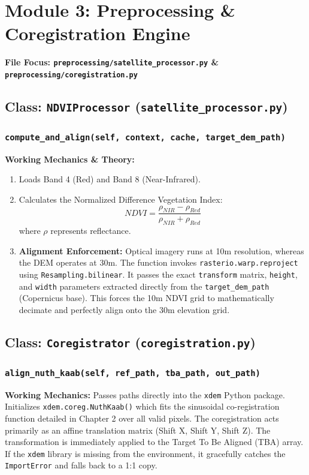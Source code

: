 \documentclass[11pt,a4paper,oneside]{report}
\begin{document}
\chapter{Module 3: Preprocessing \& Coregistration Engine}
\textbf{File Focus: \texttt{preprocessing/satellite\_processor.py} \& \texttt{preprocessing/coregistration.py}}

\section{Class: \texttt{NDVIProcessor} (\texttt{satellite\_processor.py})}
\subsection{\texttt{compute\_and\_align(self, context, cache, target\_dem\_path)}}
\textbf{Working Mechanics \& Theory:} 
\begin{enumerate}
    \item Loads Band 4 (Red) and Band 8 (Near-Infrared).
    \item Calculates the Normalized Difference Vegetation Index:
    \begin{equation}
        NDVI = \frac{\rho_{NIR} - \rho_{Red}}{\rho_{NIR} + \rho_{Red}}
    \end{equation}
    where $\rho$ represents reflectance.
    \item \textbf{Alignment Enforcement:} Optical imagery runs at 10m resolution, whereas the DEM operates at 30m. The function invokes \texttt{rasterio.warp.reproject} using \texttt{Resampling.bilinear}. It passes the exact \texttt{transform} matrix, \texttt{height}, and \texttt{width} parameters extracted directly from the \texttt{target\_dem\_path} (Copernicus base). This forces the 10m NDVI grid to mathematically decimate and perfectly align onto the 30m elevation grid.
\end{enumerate}

\section{Class: \texttt{Coregistrator} (\texttt{coregistration.py})}
\subsection{\texttt{align\_nuth\_kaab(self, ref\_path, tba\_path, out\_path)}}
\textbf{Working Mechanics:} Passes paths directly into the \texttt{xdem} Python package. Initializes \texttt{xdem.coreg.NuthKaab()} which fits the sinusoidal co-registration function detailed in Chapter 2 over all valid pixels. The coregistration acts primarily as an affine translation matrix (Shift X, Shift Y, Shift Z). The transformation is immediately applied to the Target To Be Aligned (TBA) array. If the \texttt{xdem} library is missing from the environment, it gracefully catches the \texttt{ImportError} and falls back to a 1:1 copy.
\end{document}
